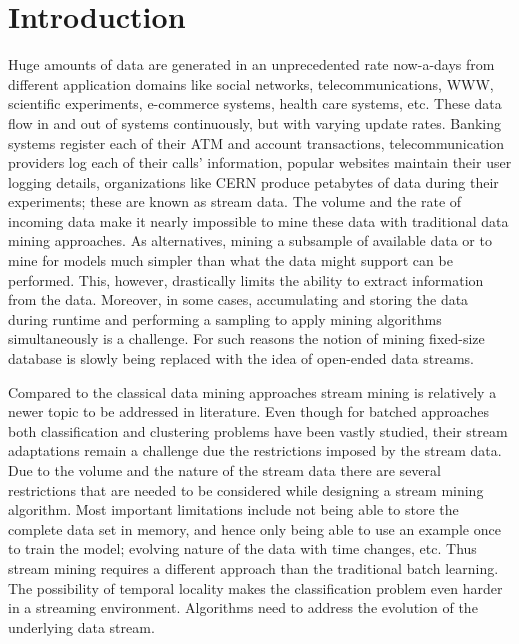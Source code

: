 \chapter{Introduction}
\label{chp:intro}
Huge amounts of data are generated in an unprecedented rate now-a-days from different application domains like social networks, telecommunications, WWW, scientific experiments, e-commerce systems, health care systems, etc. These data flow in and out of systems continuously, but with varying update rates. Banking systems register each of their ATM and account transactions, telecommunication providers log each of their calls' information, popular websites maintain their user logging details, organizations like CERN produce petabytes of data during their experiments; these are known as stream data. The volume and the rate of incoming data make it nearly impossible to mine these data with traditional data mining approaches. As alternatives, mining a subsample of available data or to mine for models much simpler than what the data might support can be performed. This, however, drastically limits the ability to extract information from the data. Moreover, in some cases, accumulating and storing the data during runtime and performing a sampling to apply mining algorithms simultaneously is a challenge. For such reasons the notion of mining fixed-size database is slowly being replaced with the idea of open-ended data streams.

Compared to the classical data mining approaches stream mining is relatively a newer topic to be addressed in literature. Even though for batched approaches both classification and clustering problems have been vastly studied, their stream adaptations remain a challenge due the restrictions imposed by the stream data. Due to the volume and the nature of the stream data there are several restrictions that are needed to be considered while designing a stream mining algorithm. Most important limitations include not being able to store the complete data set in memory, and hence only being able to use an example once to train the model; evolving nature of the data with time changes, etc. Thus stream mining requires a different approach than the traditional batch learning. The possibility of temporal locality makes the classification problem even harder in a streaming environment. Algorithms need to address the evolution of the underlying data stream.

